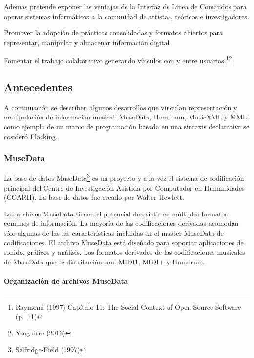 \documentclass[]{article}
\let\oldparagraph\paragraph
\renewcommand{\paragraph}[1]{\oldparagraph{#1}\mbox{}}
\begin{document}
Ademas pretende exponer las ventajas de la Interfaz de Linea de Comandos
para operar sistemas informáticos a la comunidad de artistas, teóricos e
investigadores.

Promover la adopción de prácticas consolidadas y formatos abiertos para
representar, manipular y almacenar información digital.

Fomentar el trabajo colaborativo generando vínculos con y entre
usuarios.\footnote{Raymond (1997) Capítulo 11: The Social Context of
  Open-Source Software (p.~11)}\footnote{Yzaguirre (2016)}

\newpage

\hypertarget{antecedentes}{%
\subsection{Antecedentes}\label{antecedentes}}

A continuación se describen algunos desarrollos que vinculan
representación y manipulación de información musical: MuseData, Humdrum,
MusicXML y MML; como ejemplo de un marco de programación basada en una
sintaxis declarativa se cosideró Flocking.

\hypertarget{musedata}{%
\subsubsection{MuseData}\label{musedata}}

La base de datos MuseData\footnote{Selfridge-Field (1997)} es un
proyecto y a la vez el sistema de codificación principal del Centro de
Investigación Asistida por Computador en Humanidades (CCARH). La base de
datos fue creado por Walter Hewlett.

Los archivos MuseData tienen el potencial de existir en múltiples
formatos comunes de información. La mayoría de las codificaciones
derivadas acomodan sólo algunas de las las características incluidas en
el master MuseData de codificaciones. El archivo MuseData está diseñado
para soportar aplicaciones de sonido, gráficos y análisis. Los formatos
derivados de las codificaciones musicales de MuseData que se
distribución son: MIDI1, MIDI+ y Humdrum.

\hypertarget{organizaciuxf3n-de-archivos-musedata}{%
\paragraph{Organización de archivos
MuseData}\label{organizaciuxf3n-de-archivos-musedata}}
\end{document}
